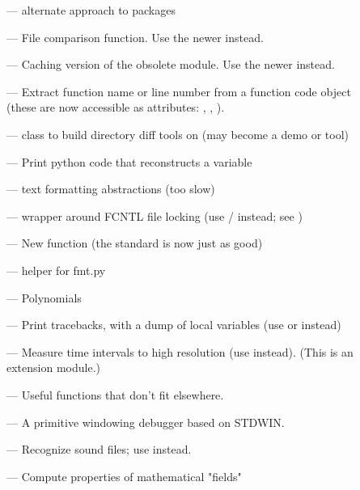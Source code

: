
\begin{description}
\item[]
--- alternate approach to packages

\item[]
--- File comparison function.  Use the newer  instead.

\item[]
--- Caching version of the obsolete  module.  Use the
newer  instead.

\item[]
--- Extract function name or line number from a function
code object (these are now accessible as attributes:
, ,
).

\item[]
--- class to build directory diff tools on (may become a demo or tool)

\item[]
--- Print python code that reconstructs a variable

\item[]
--- text formatting abstractions (too slow)

\item[]
--- wrapper around FCNTL file locking (use
/ instead; see )

\item[]
--- New  function (the standard  is
now just as good)

\item[]
--- helper for fmt.py

\item[]
--- Polynomials

\item[]
--- Print tracebacks, with a dump of local variables (use
 or  instead)

\item[]
--- Measure time intervals to high resolution (use
 instead).  (This is an extension module.)

\item[]
--- Useful functions that don't fit elsewhere.

\item[]
--- A primitive windowing debugger based on STDWIN.

\item[]
--- Recognize sound files; use  instead.

\item[]
--- Compute properties of mathematical "fields"
\end{description}


